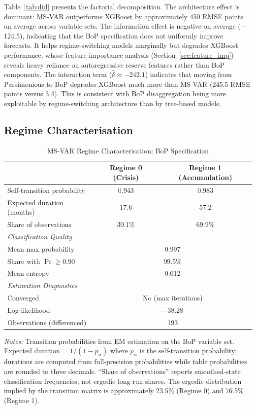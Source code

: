 \documentclass[12pt,a4paper]{article}
\begin{document}
Table~\ref{tab:did} presents the factorial decomposition. The architecture effect is dominant: MS-VAR outperforms XGBoost by approximately 450 RMSE points on average across variable sets. The information effect is negative on average ($-$124.5), indicating that the BoP specification does not uniformly improve forecasts. It helps regime-switching models marginally but degrades XGBoost performance, whose feature importance analysis (Section~\ref{sec:feature_imp}) reveals heavy reliance on autoregressive reserve features rather than BoP components. The interaction term ($\hat{\delta} \approx -242.1$) indicates that moving from Parsimonious to BoP degrades XGBoost much more than MS-VAR (245.5 RMSE points versus 3.4). This is consistent with BoP disaggregation being more exploitable by regime-switching architecture than by tree-based models.

\subsection{Regime Characterisation}
\label{sec:regime_char}

\begin{table}[htbp]
\centering
\caption{MS-VAR Regime Characterisation: BoP Specification}
\label{tab:regime_char}
\begin{tabular}{lcc}
\toprule
& Regime 0 (Crisis) & Regime 1 (Accumulation) \\
\midrule
Self-transition probability & 0.943 & 0.983 \\
Expected duration (months) & 17.6 & 57.2 \\
Share of observations & 30.1\% & 69.9\% \\
\midrule
\multicolumn{3}{l}{\textit{Classification Quality}} \\
Mean max probability & \multicolumn{2}{c}{0.997} \\
Share with $\Pr \geq 0.90$ & \multicolumn{2}{c}{99.5\%} \\
Mean entropy & \multicolumn{2}{c}{0.012} \\
\midrule
\multicolumn{3}{l}{\textit{Estimation Diagnostics}} \\
Converged & \multicolumn{2}{c}{No (max iterations)} \\
Log-likelihood & \multicolumn{2}{c}{$-$38.28} \\
Observations (differenced) & \multicolumn{2}{c}{193} \\
\bottomrule
\end{tabular}
\begin{tablenotes}
\small
\item \textit{Notes:} Transition probabilities from EM estimation on the BoP variable set. Expected duration = $1/(1-p_{ii})$ where $p_{ii}$ is the self-transition probability; durations are computed from full-precision probabilities while table probabilities are rounded to three decimals. ``Share of observations'' reports smoothed-state classification frequencies, not ergodic long-run shares. The ergodic distribution implied by the transition matrix is approximately 23.5\% (Regime 0) and 76.5\% (Regime 1).
\end{tablenotes}
\end{table}
\end{document}
